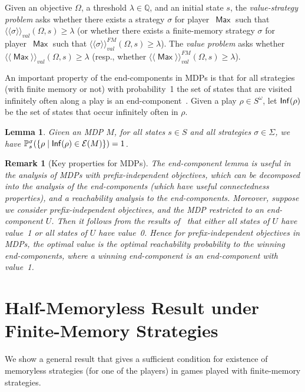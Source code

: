 \documentclass{article}
\newtheorem{lemma}{Lemma}
\newtheorem{remark}{Remark}
\newcommand{\rat}{\mathbb Q}
\newcommand{\Inf}{{\sf Inf}}
\newcommand{\cale}{\mathcal E}
\newcommand{\winval}[1]{\langle \! \langle #1 \rangle\! \rangle_{\mathit{val}} }
\newcommand{\va}{\winval{\ma}}
\newcommand{\vaf}{\winval{\ma}^{{FM}}}
\newcommand{\straava}{\winval{\straa}}
\newcommand{\straavaf}{\winval{\straa}^{{FM}}}
\newcommand{\straa}{\sigma}
\newcommand{\Straa}{\Sigma}
\DeclareMathOperator{\ma}{\mathsf{Max}}
\newcommand{\prob}[1]{\mathbb{P}_{#1}}
\begin{document}
\smallskip{}
Given an objective $\Omega$, a threshold $\lambda \in \rat$, and an initial state $s$, 
the \emph{value-strategy problem} 
asks whether there exists a strategy $\straa$ for player~$\ma$
such that $\straava(\Omega,s) \geq \lambda$ (or whether there exists a finite-memory 
strategy $\straa$ for player~$\ma$ such that $\straavaf(\Omega,s) \geq \lambda$).
The \emph{value problem} asks whether $\va(\Omega,s) \geq \lambda$ (resp., whether
$\vaf(\Omega,s) \geq \lambda$).



\smallskip{}
An important property of the end-components in MDPs is that for all 
strategies (with finite memory or not) with probability~1 the set
of states that are visited infinitely often along a play is
an end-component~\cite{CY95,deAlfaro97}. 
Given a play $\rho \in S^\omega$, let $\Inf(\rho)$ be the set of states 
that occur infinitely often in $\rho$.

\begin{lemma}\label{lem:end-component}
  \cite{CY95,deAlfaro97} Given an MDP $M$, for all states $s \in S$
  and all strategies $\straa \in \Straa$, we have
  $\prob{s}^{\straa}(\{ \rho \mid \Inf(\rho) \in \cale(M) \}) = 1$.
\end{lemma}


\begin{remark}[Key properties for MDPs]\label{rem:key}
The end-component lemma is useful in the analysis of MDPs with 
prefix-independent objectives, which can be decomposed into the analysis of the 
end-components (which have useful connectedness properties), 
and a reachability analysis to the end-components.
Moreover, suppose we consider prefix-independent objectives, and the 
MDP restricted to an end-component $U$. 
Then it follows from the results of~\cite{Cha07b} that either all states of $U$ 
have value~1 or all states of $U$ have value~0. 
Hence for prefix-independent objectives in MDPs, the optimal value is the optimal 
reachability probability to the {\em winning} end-components, where a
winning end-component is an end-component with value~1.
\end{remark}






\section{Half-Memoryless Result under Finite-Memory Strategies}\label{sec:half}
We show a general result that gives a sufficient condition for existence of memoryless
strategies (for one of the players) in games played with finite-memory strategies.
\end{document}
